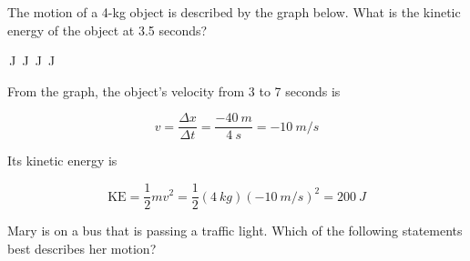 \documentclass[]{exam}
\begin{document}
\begin{questions}

\clearpage
\question %
The motion of a 4-kg object is described by the graph below. What is the kinetic energy of the object at 3.5 seconds?

\begin{center}
\end{center}

\begin{randomizechoices}
    \,J
    \,J
    \,J
    \,J
\end{randomizechoices}

\begin{solution}
    From the graph, the object's velocity from 3 to 7 seconds is

    \begin{equation*}
        v = \frac{\Delta x}{\Delta t} = \frac{-\SI{40}{m}}{\SI{4}{s}} = -\SI{10}{m/s}
    \end{equation*}

    Its kinetic energy is

    \begin{equation*}
        \mathrm{KE} = \frac{1}{2}mv^2 = \frac{1}{2}\left(\SI{4}{kg}\right)\left(-\SI{10}{m/s}\right)^2 = \boxed{\SI{200}{J}}
    \end{equation*}
\end{solution}

\question 
Mary is on a bus that is passing a traffic light. Which of the following statements best describes her motion?


\end{questions}
\end{document}
